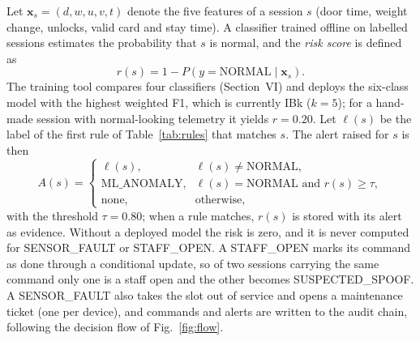 Let $\mathbf{x}_s = (d, w, u, v, t)$ denote the five features of a session $s$ (door time, weight change, unlocks,
valid card and stay time). A classifier trained offline on labelled sessions estimates the probability that $s$ is
normal, and the \emph{risk score} is defined as
\begin{equation}
r(s) = 1 - P\left(y = \text{NORMAL} \mid \mathbf{x}_s\right).
\label{eq:risk}
\end{equation}
The training tool compares four classifiers (Section~VI) and deploys the six-class model with the highest weighted F1,
which is currently IBk ($k=5$); for a hand-made session with normal-looking telemetry it yields $r = 0.20$. Let
$\ell(s)$ be the label of the first rule of Table~\ref{tab:rules} that matches $s$. The alert raised for $s$ is then
\begin{equation}
A(s) =
\begin{cases}
\ell(s), & \ell(s) \neq \text{NORMAL},\\
\text{ML\_ANOMALY}, & \ell(s) = \text{NORMAL} \text{ and } r(s) \geq \tau,\\
\text{none}, & \text{otherwise},
\end{cases}
\label{eq:alert}
\end{equation}
with the threshold $\tau = 0.80$; when a rule matches, $r(s)$ is stored with its alert as evidence. Without a
deployed model the risk is zero, and it is never computed for SENSOR\_FAULT or STAFF\_OPEN. A STAFF\_OPEN marks its
command as done through a conditional update, so of two sessions carrying the same command only one is a staff open and
the other becomes SUSPECTED\_SPOOF. A SENSOR\_FAULT also takes the slot out of service and opens a maintenance ticket
(one per device), and commands and alerts are written to the audit chain, following the decision flow of
Fig.~\ref{fig:flow}.

